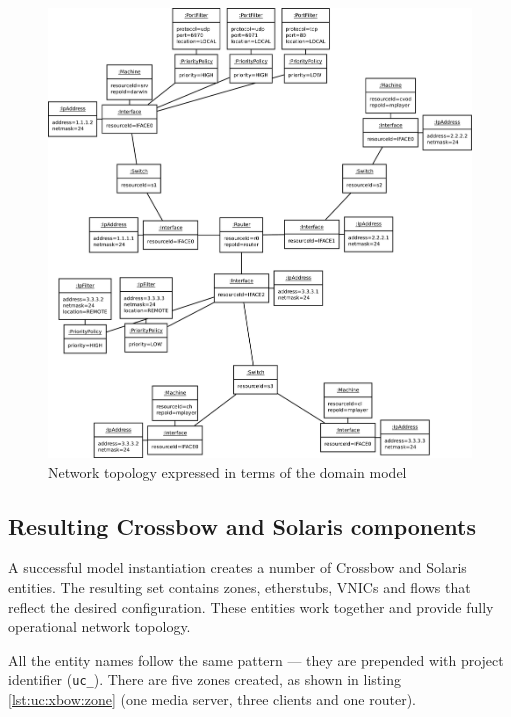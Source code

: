 \documentclass[11pt]{book}
\begin{document}
        \begin{figure}[H]
          \includegraphics[width=.9\textwidth]{img/test-case/topology-om.pdf}

          \caption{Network topology expressed in terms of the domain model}
          \label{fig:cs:topo}
        \end{figure}

      
      
      \subsection{Resulting Crossbow and Solaris components}
      \label{sub:uc:xbow}

        A successful model instantiation creates a number of Crossbow and Solaris entities. The resulting set contains
        zones, etherstubs, VNICs and flows that reflect the desired configuration. These entities work together and
        provide fully operational network topology.

        All the entity names follow the same pattern --- they are prepended with project identifier (\texttt{uc\_}).
        There are five zones created, as shown in listing \ref{lst:uc:xbow:zone} (one media server, three clients and
        one router). \\
\end{document}
